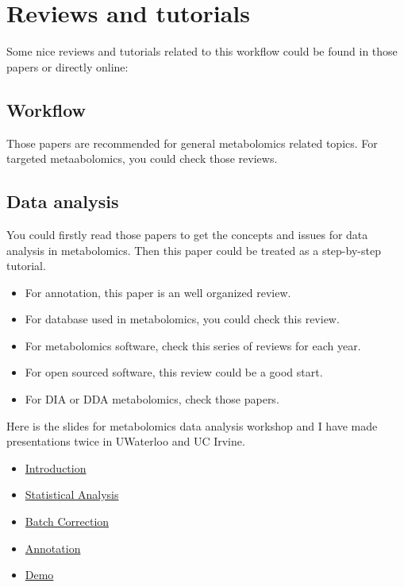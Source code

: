 \documentclass[
]{book}
\begin{document}
\hypertarget{reviews-and-tutorials}{%
\section{Reviews and tutorials}\label{reviews-and-tutorials}}

Some nice reviews and tutorials related to this workflow could be found in those papers or directly online:

\hypertarget{workflow}{%
\subsection{Workflow}\label{workflow}}

Those papers are recommended\citep{barnes2016a, cajka2016, lu2008, fiehn2002} for general metabolomics related topics. For targeted metaabolomics, you could check those reviews\citep{begou2017, zhou2016, lu2008a, weljie2006, yuan2012, griffiths2010}.

\hypertarget{data-analysis}{%
\subsection{Data analysis}\label{data-analysis}}

You could firstly read those papers\citep{barnes2016, alonso2015, kusonmano2016, madsen2010, uppal2016} to get the concepts and issues for data analysis in metabolomics. Then this paper\citep{gromski2015} could be treated as a step-by-step tutorial.

\begin{itemize}
\item
  For annotation, this paper\citep{domingo-almenara2018} is an well organized review.
\item
  For database used in metabolomics, you could check this review\citep{vinaixa2016}.
\item
  For metabolomics software, check this series of reviews for each year\citep{misra2016, misra2017, misra2018}.
\item
  For open sourced software, this review\citep{spicer2017} could be a good start.
\item
  For DIA or DDA metabolomics, check those papers\citep{bilbao2015, fenaille2017}.
\end{itemize}

Here is the slides for metabolomics data analysis workshop and I have made presentations twice in UWaterloo and UC Irvine.

\begin{itemize}
\item
  \href{http://yufree.github.io/presentation/metabolomics/introduction\#1}{Introduction}
\item
  \href{http://yufree.github.io/presentation/metabolomics/StatisticalAnalysis\#1}{Statistical Analysis}
\item
  \href{http://yufree.github.io/presentation/metabolomics/BatchCorrection\#1}{Batch Correction}
\item
  \href{http://yufree.github.io/presentation/metabolomics/Annotation\#1}{Annotation}
\item
  \href{http://yufree.github.io/presentation/metabolomics/demo\#1}{Demo}
\end{itemize}
\end{document}
